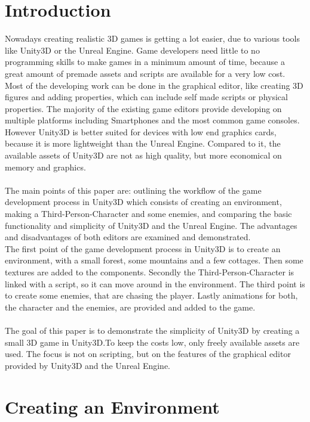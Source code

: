 \documentclass[conference]{IEEEtran}
\begin{document}
\section{Introduction}
Nowadays creating realistic 3D games is getting a lot easier, due to various tools like Unity3D or the Unreal Engine. Game developers need little to no programming skills to make games in a minimum amount of time, because a great amount of premade assets and scripts are available for a very low cost. Most of the developing work can be done in the graphical editor, like creating 3D figures and adding properties, which can include self made scripts or physical properties. The majority of the existing game editors provide developing on multiple platforms including Smartphones and the most common game consoles. However Unity3D is better suited for devices with low end graphics cards, because it is more lightweight than the Unreal Engine. Compared to it, the available assets of Unity3D are not as high quality, but more economical on memory and graphics. \\ \\
The main points of this paper are: outlining the workflow of the game development process in Unity3D which consists of creating an environment, making a Third-Person-Character and some enemies, and comparing the basic functionality and simplicity of Unity3D and the Unreal Engine. The advantages and disadvantages of both editors are examined and demonstrated. \\
The first point of the game development process in Unity3D is to create an environment, with a small forest, some mountains and a few cottages. Then some textures are added to the components.
Secondly the Third-Person-Character is linked with a  script, so it can move around in the environment.
The third point is to create some enemies, that are chasing the player. 
Lastly animations for both, the character and the enemies, are provided and added to the game. \\ \\
The goal of this paper is to demonstrate the simplicity of Unity3D by creating a small 3D game in Unity3D.To keep the costs low, only freely available assets are used. The focus is not on scripting, but on the features of the graphical editor provided by Unity3D and the Unreal Engine. 


\section{Creating an Environment}
\end{document}
